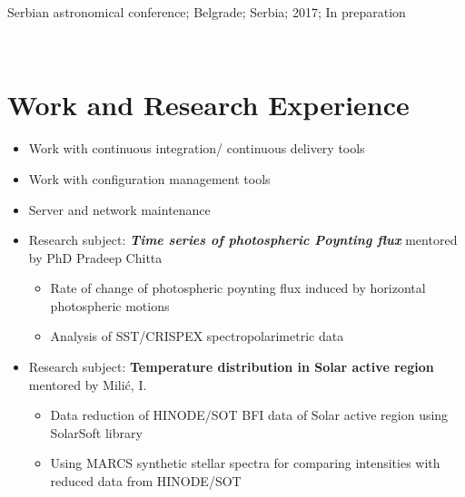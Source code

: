 \documentclass[12p,a4paper,sans]{moderncv}        %
\begin{document}
	 {Serbian astronomical conference; Belgrade; Serbia; 2017; In preparation}

	{\vspace{0.65 cm}}
	
	 \\
	


\section{Work and Research Experience}

	{	
	\begin{itemize}
	\item{Work with continuous integration/ continuous delivery  tools}
	\item{Work with configuration management tools}
	\item{Server and network maintenance} 
	\end{itemize}
	}

	{
    	\begin{itemize}
            \item{Research subject: \textbf{\textit{Time series of photospheric Poynting flux}} mentored by PhD Pradeep Chitta}
            \begin{itemize}
				\item{Rate of change of photospheric poynting flux induced by horizontal photospheric motions}
                \item{Analysis of SST/CRISPEX spectropolarimetric data}
             \end{itemize}
		\end{itemize}
    }

	{
    	\begin{itemize}
            \item{Research subject: \textbf{Temperature distribution in Solar active region} mentored by Milić, I.}
            \begin{itemize}
				\item{Data reduction of HINODE/SOT BFI data of Solar active region using SolarSoft library}
                \item{Using MARCS synthetic stellar spectra for comparing intensities with reduced data from HINODE/SOT}
			\end{itemize}
		\end{itemize}
    }
\end{document}
